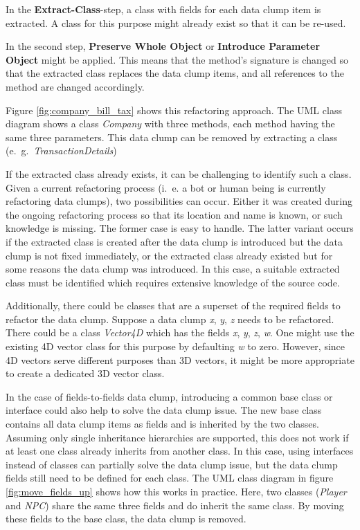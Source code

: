 In the  \textbf{Extract-Class}-step, a class with fields for each data clump item is extracted. A class for this purpose might already exist so that it can be re-used.

In the second step, \textbf{Preserve Whole Object} or \textbf{Introduce Parameter Object} might be applied. This means that the method's signature is changed so that the extracted class replaces the data clump items, and all references to the method are changed accordingly.

Figure \ref{fig:company_bill_tax} shows this refactoring approach. The \ac{UML} class diagram shows a class \textit{Company} with three methods, each method having the same three parameters. This data clump can be removed by extracting a class (e.~g.~\textit{TransactionDetails})

If the extracted class already exists, it can be challenging to identify such a class. Given a current refactoring process (i.~e. a bot or human being is currently refactoring data clumps), two possibilities can occur. Either it was created during the ongoing refactoring process so that its location and name is known, or such knowledge is missing. The former case is easy to handle.  The latter variant occurs if the extracted class is created after the data clump is introduced but the data clump is not fixed immediately, or the extracted class already existed but for some reasons the data clump was introduced. In this case, a suitable extracted class must be identified which requires extensive knowledge of the source code.

Additionally, there could be classes that are a superset of the required fields to refactor the data clump. Suppose a data clump \textit{x}, \textit{y}, \textit{z} needs to be refactored. There could be a  class \textit{Vector4D} which has the fields  \textit{x}, \textit{y}, \textit{z}, \textit{w}. One might use the existing 4D vector class for this purpose by defaulting \textit{w} to zero. However, since 4D vectors serve different purposes than 3D vectors, it might be more appropriate to create a dedicated 3D vector class.


In the case of fields-to-fields data clump, introducing a common base class or interface could also help to solve the data clump issue. The new base class contains all data clump items as fields and is inherited by the two classes. Assuming only single inheritance hierarchies are supported, this does not work if at least one class already inherits from another class. In this case, using interfaces instead of classes can partially solve the data clump issue, but the data clump fields still need to be defined for each class. The \ac{UML} class diagram in figure \ref{fig:move_fields_up} shows how this works in practice. Here, two classes (\textit{Player} and \textit{NPC}) share the same three fields and do inherit the same class. By moving these fields to the base class, the data clump is removed. 

